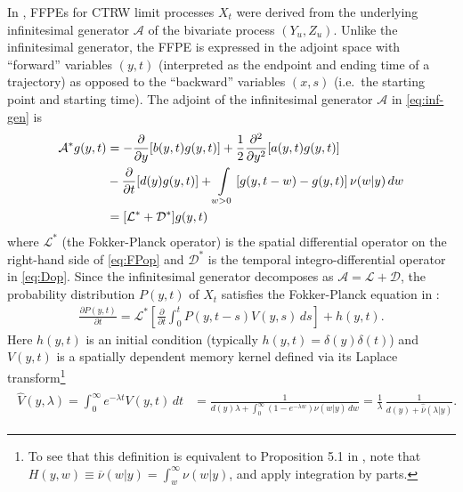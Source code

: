 \documentclass[a4paper,12pt]{elsarticle}
\numberwithin{equation}{section}
\theoremstyle{plain}
\theoremstyle{definition}
\theoremstyle{remark}
\numberwithin{equation}{section}
\newcommand{\1}{\mathbf 1}
\newcommand{\del}{\partial}
\begin{document}
In \cite{BaeumerStraka16}, FFPEs for CTRW limit processes $X_t$ were derived
from the underlying infinitesimal generator $\mathcal A$ of the bivariate
process $(Y_u, Z_u)$.
Unlike the infinitesimal generator, the FFPE is expressed in the adjoint
space with ``forward'' variables $(y,t)$ (interpreted as the endpoint and
ending time of a trajectory) as opposed to the ``backward'' variables $(x,s)$
(i.e.\ the starting point and starting time).
The adjoint of the infinitesimal generator $\mathcal A$ in \eqref{eq:inf-gen}
is
\begin{align}
\label{eq:FPop}
\mathcal A^* g(y,t)
&= -\frac{\partial }{\partial y}[b(y,t) g(y,t)]
+\frac{1}{2}\frac{\partial^2 }{\partial y^2}[a(y,t) g(y,t)]
\\
\label{eq:Dop}
&-\frac{\partial }{\partial t}[d(y) g(y,t)]
+ \int\limits_{w > 0} \left[g(y, t-w)-g(y, t)
\right] \nu(w | y) \, dw
\\ \notag
&= [\mathcal L^* + \mathcal D^*] g(y,t)
\end{align}
where $\mathcal L^*$ (the Fokker-Planck operator) is the spatial differential
operator on the right-hand side of \eqref{eq:FPop} and $\mathcal D^*$ is the
temporal integro-differential operator in \eqref{eq:Dop}.
Since the infinitesimal generator decomposes as
$\mathcal A = \mathcal L + \mathcal D$, the probability distribution $P(y,t)$
of $X_t$ satisfies the Fokker-Planck equation in \cite[(5.2)]{BaeumerStraka16}:
\begin{align} \label{eq:FFPE}
\frac{\del P(y,t)}{\del t} = \mathcal L^* \left[ \frac{\partial}{\partial t}
\int_0^t P(y,t-s) V(y,s)\,ds \right] + h(y,t).
\end{align}
Here $h(y,t)$ is an initial condition (typically $h(y,t) = \delta(y) \delta(t)$)
and $V(y,t)$ is a spatially dependent memory kernel defined via its Laplace
transform\footnote{To see that this definition is equivalent to Proposition 5.1
in \cite{BaeumerStraka16}, note that $H(y,w) \equiv \overline \nu(w|y) = \int_w^\infty \nu(w|y)$,
and apply integration by parts.}
\begin{align} \label{eq:LT-renewal-measure}
\begin{split}
\hat V(y,\lambda) = \int_0^\infty e^{-\lambda t} V(y,t)\,dt
&= \frac{1}{d(y)\lambda + \int_0^\infty (1-e^{-\lambda w})
\nu(w | y)\,dw}
= \frac{1}{\lambda} \, \frac{1}{d(y) + \hat{\overline{\nu}}(\lambda|y)}.
\end{split}
\end{align}
\end{document}
